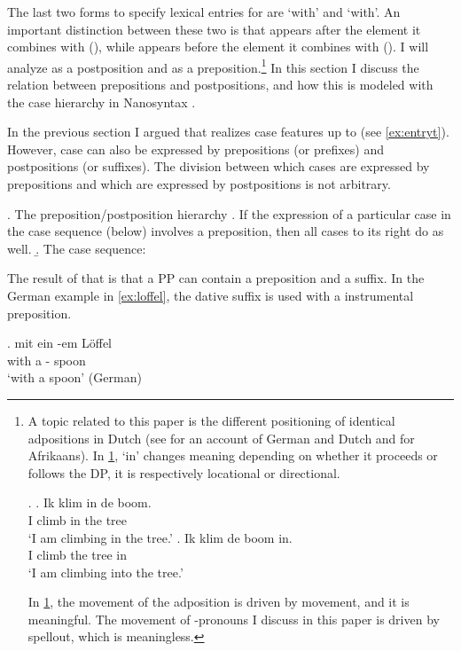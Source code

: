 \documentclass[12pt]{article}
\begin{document}
The last two forms to specify lexical entries for are  `with' and  `with'. An important distinction between these two is that  appears after the element it combines with (), while  appears before the element it combines with (). I will analyze  as a postposition and  as a preposition.\footnote{A topic related to this paper is the different positioning of identical adpositions in Dutch (see \citet{caha2010} for an account of German and Dutch and \citet{pretorius2017} for Afrikaans). In \ref{ex:dutchin},  `in' changes meaning depending on whether it proceeds or follows the DP, it is respectively locational or directional.

\ex.\label{ex:dutchin}
\ag. Ik klim in de boom.\\
 I climb in the tree\\
 `I am climbing in the tree.'
\bg. Ik klim de boom in.\\
 I climb the tree in\\
 `I am climbing into the tree.'

In \ref{ex:dutchin}, the movement of the adposition is driven by movement, and it is meaningful. The movement of -pronouns I discuss in this paper is driven by spellout, which is meaningless.} In this section I discuss the relation between prepositions and postpositions, and how this is modeled with the case hierarchy in Nanosyntax \citep{caha2009}.

In the previous section I argued that  realizes case features up to  (see \ref{ex:entryt}). However, case can also be expressed by prepositions (or prefixes) and postpositions (or suffixes). The division between which cases are expressed by prepositions and which are expressed by postpositions is not arbitrary.

\ex. The preposition/postposition hierarchy
\a. If the expression of a particular case in the case sequence (below) involves a preposition, then all cases to its right do as well.
\b. The case sequence:  \hfill \citep{caha2009}

The result of that is that a PP can contain a preposition and a suffix. In the German example in \ref{ex:loffel}, the dative suffix is used with a instrumental preposition.

\exg. mit ein -em Löffel\\
with a - spoon\\
`with a spoon' \hfill (German)\label{ex:loffel}
\end{document}
